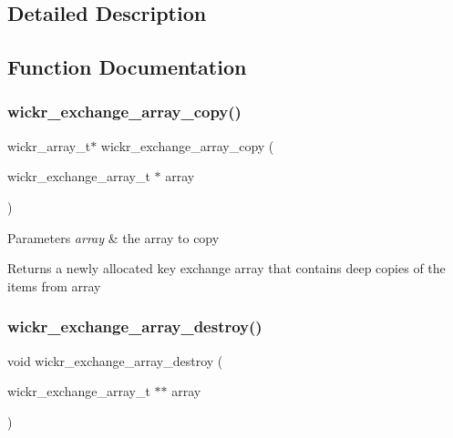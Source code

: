 \subsection{Detailed Description}


\subsection{Function Documentation}
\mbox{\label{group__wickr__key__exchange_gacd04405337871aa3bcd550a051d778e1}} 
\subsubsection{\texorpdfstring{wickr\+\_\+exchange\+\_\+array\+\_\+copy()}{wickr\_exchange\_array\_copy()}}
{\footnotesize\ttfamily wickr\+\_\+array\+\_\+t$\ast$ wickr\+\_\+exchange\+\_\+array\+\_\+copy (\begin{DoxyParamCaption}\item[{wickr\+\_\+exchange\+\_\+array\+\_\+t $\ast$}]{array }\end{DoxyParamCaption})}


\begin{DoxyParams}{Parameters}
{\em array} & the array to copy \\
\hline
\end{DoxyParams}
\begin{DoxyReturn}{Returns}
a newly allocated key exchange array that contains deep copies of the items from \textquotesingle{}array\textquotesingle{} 
\end{DoxyReturn}
\mbox{\label{group__wickr__key__exchange_gadc1e5f5836bc09c1d6b8d6203d02a0eb}} 
\subsubsection{\texorpdfstring{wickr\+\_\+exchange\+\_\+array\+\_\+destroy()}{wickr\_exchange\_array\_destroy()}}
{\footnotesize\ttfamily void wickr\+\_\+exchange\+\_\+array\+\_\+destroy (\begin{DoxyParamCaption}\item[{wickr\+\_\+exchange\+\_\+array\+\_\+t $\ast$$\ast$}]{array }\end{DoxyParamCaption})}



